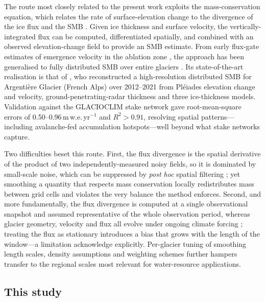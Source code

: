 The route most closely related to the present work exploits the mass-conservation equation, which relates the rate of surface-elevation change to the divergence of the ice flux and the SMB \citep{cuffey2010}. Given ice thickness and surface velocity, the vertically-integrated flux can be computed, differentiated spatially, and combined with an observed elevation-change field to provide an SMB estimate. From early flux-gate estimates of emergence velocity in the ablation zone \citep{berthier2012, brun2018}, the approach has been generalised to fully distributed SMB over entire glaciers \citep{bisset2020, miles2021, pelto2021, vantricht2021, kneib2022}. Its state-of-the-art realisation is that of \citet{kneib2024}, who reconstructed a high-resolution distributed SMB for Argentière Glacier (French Alps) over 2012--2021 from Pléiades elevation change and velocity, ground-penetrating-radar thickness and three ice-thickness models. Validation against the GLACIOCLIM stake
network gave root-mean-square errors of 0.50--0.96\,m\,w.e.\,yr$^{-1}$ and
$R^2 > 0.91$, resolving spatial patterns---including avalanche-fed accumulation
hotspots---well beyond what stake networks capture.

Two difficulties beset this route. First, the flux divergence is the spatial derivative of the product of two independently-measured noisy fields, so it is
dominated by small-scale noise, which can be suppressed by \emph{post hoc} spatial
filtering \citep{vantricht2021, bisset2020}; yet smoothing a quantity that respects mass conservation locally redistributes mass between grid cells and violates the very balance the method enforces. Second, and more fundamentally, the flux divergence is computed at a single observational snapshot and assumed representative of the whole observation period, whereas glacier geometry, velocity and flux all evolve under ongoing climate forcing \citep{johannesson1989, zekollari2015}; treating the flux as stationary introduces a bias that grows with the length of the window---a limitation \citet{kneib2024} acknowledge explicitly. Per-glacier tuning of smoothing length scales, density assumptions and weighting schemes further hampers transfer to the regional scales most relevant for water-resource applications.

\subsection{This study}\label{sec:contribution}

